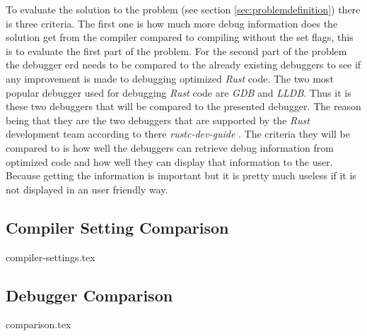 

To evaluate the solution to the problem (see section \ref{sec:problemdefinition}) there is three criteria.
The first one is how much more debug information does the solution get from the compiler compared to compiling without the set flags, this is to evaluate the first part of the problem. 
For the second part of the problem the debugger \gls{erd} needs to be compared to the already existing debuggers to see if any improvement is made to debugging optimized \emph{Rust} code.
The two most popular debugger used for debugging \emph{Rust} code are \emph{GDB} and \emph{LLDB}.
Thus it is these two debuggers that will be compared to the presented debugger.
The reason being that they are the two debuggers that are supported by the \emph{Rust} development team according to there \emph{rustc-dev-guide} \cite{rust-dev-guide}.
The criteria they will be compared to is how well the debuggers can retrieve debug information from optimized code and how well they can display that information to the user.
Because getting the information is important but it is pretty much useless if it is not displayed in an user friendly way.


\subsection{Compiler Setting Comparison}
\label{sec:settingscomparison}
{compiler-settings.tex}


\subsection{Debugger Comparison}
\label{sec:debuggercomparison}
{comparison.tex}

